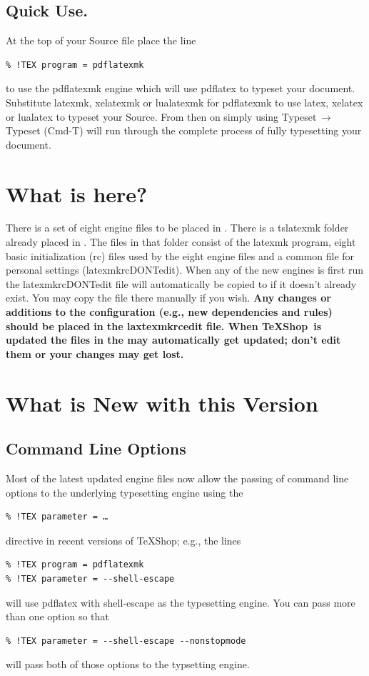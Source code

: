 \documentclass[11pt]{article}
\newcommand{\mnu}[1]{\textsf{#1}}
\newcommand{\cmd}[1]{\textsf{#1}}
\newcommand{\To}{\,\(\to\)\,}
\newcommand{\TS}{\textsf{\TeX Shop}}
\begin{document}
\subsection{Quick Use.}

At the top of your Source file place the line
\begin{verbatim}
% !TEX program = pdflatexmk
\end{verbatim}
to use the \cmd{pdflatexmk} engine which will use \cmd{pdflatex} to typeset your document. Substitute \cmd{latexmk}, \cmd{xelatexmk} or \cmd{lualatexmk} for \cmd{pdflatexmk} to use \cmd{latex}, \cmd{xelatex} or \cmd{lualatex} to typeset your Source. From then on simply using \mnu{Typeset}\To\mnu{Typeset} (\cmd{Cmd-T}) will run through the complete process of fully typesetting your document.

\section{What is here?}

There is a set of eight \cmd{engine} files to be placed in . There is a \cmd{tslatexmk} folder already placed in . The files in that folder consist of the \cmd{latexmk} program, eight basic initialization (\cmd{rc}) files used by the eight \cmd{engine} files and a common file for personal settings (\cmd{latexmkrcDONTedit}). When any of the new engines is first run the \cmd{latexmkrcDONTedit} file will automatically be copied to  if it doesn't already exist. You may copy the file there manually if you wish. \textbf{Any changes or additions to the configuration (e.g., new dependencies and rules) should be placed in the \cmd{laxtexmkrcedit} file. When \TS\ is updated the files in the  may automatically get updated; don't edit them or your changes may get lost.}

\section{What is New with this Version}

\subsection{Command Line Options}\label{sec:CLO}

Most of the latest updated engine files now allow the passing of command line options to the underlying typesetting engine using the 
\begin{verbatim}
% !TEX parameter = …
\end{verbatim}
directive in recent versions of \TS; e.g., the lines
\begin{verbatim}
% !TEX program = pdflatexmk
% !TEX parameter = --shell-escape
\end{verbatim}
will use \cmd{pdflatex} with \cmd{shell-escape} as the typesetting engine. You can pass more than one option so that
\begin{verbatim}
% !TEX parameter = --shell-escape --nonstopmode
\end{verbatim}
will pass both of those options to the typsetting engine.
\end{document}
